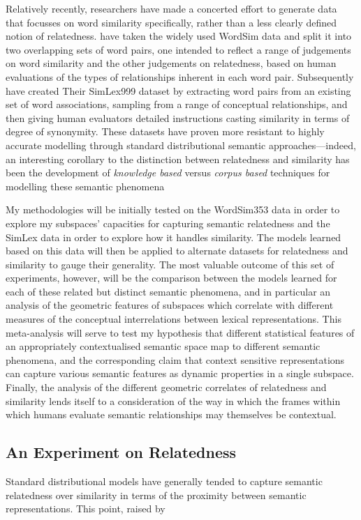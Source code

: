 Relatively recently, researchers have made a concerted effort to generate data that focusses on word similarity specifically, rather than a less clearly defined notion of relatedness.  \cite{AgirreEA2009} have taken the widely used WordSim data and split it into two overlapping sets of word pairs, one intended to reflect a range of judgements on word similarity and the other judgements on relatedness, based on human evaluations of the types of relationships inherent in each word pair.  Subsequently \cite{HillEA2015} have created Their SimLex999 dataset by extracting word pairs from an existing set of word associations, sampling from a range of conceptual relationships, and then giving human evaluators detailed instructions casting similarity in terms of degree of synonymity.  These datasets have proven more resistant to highly accurate modelling through standard distributional semantic approaches---indeed, an interesting corollary to the distinction between relatedness and similarity has been the development of \emph{knowledge based} versus \emph{corpus based} techniques for modelling these semantic phenomena \citep{MihalceaEA2006,HassanEA2011}

My methodologies will be initially tested on the WordSim353 data in order to explore my subspaces' capacities for capturing semantic relatedness and the SimLex data in order to explore how it handles similarity.  The models learned based on this data will then be applied to alternate datasets for relatedness and similarity to gauge their generality.  The most valuable outcome of this set of experiments, however, will be the comparison between the models learned for each of these related but distinct semantic phenomena, and in particular an analysis of the geometric features of subspaces which correlate with different measures of the conceptual interrelations between lexical representations.  This meta-analysis will serve to test my hypothesis that different statistical features of an appropriately contextualised semantic space map to different semantic phenomena, and the corresponding claim that context sensitive representations can capture various semantic features as dynamic properties in a single subspace.  Finally, the analysis of the different geometric correlates of relatedness and similarity lends itself to a consideration of the way in which the frames within which humans evaluate semantic relationships may themselves be contextual.

\subsection{An Experiment on Relatedness}
Standard distributional models have generally tended to capture semantic relatedness over similarity in terms of the proximity between semantic representations.  This point, raised by

